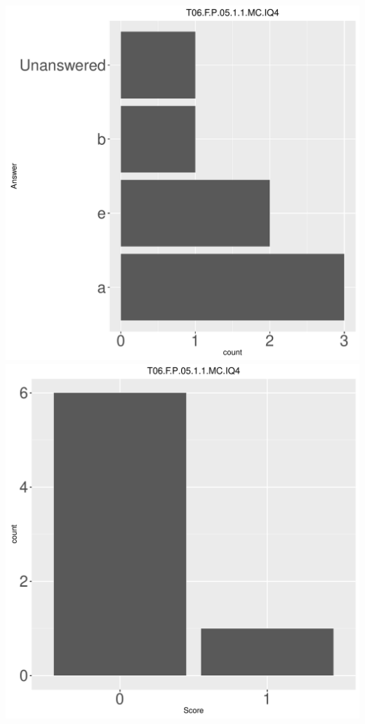 \documentclass[12pt,english,nohyper]{tufte-handout}\usepackage[]{graphicx}\usepackage[]{color}
\begin{document}
\begin{center} \includegraphics[width=.45\linewidth]{Topic06_AB_62_answer} \includegraphics[width=.45\linewidth]{Topic06_AB_62_score} \end{center} 
\end{document}
